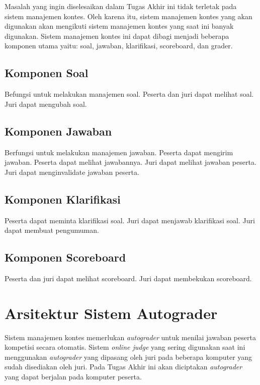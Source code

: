 \par Masalah yang ingin diselesaikan dalam Tugas Akhir ini tidak terletak pada sistem manajemen kontes. Oleh karena itu, sistem manajemen kontes yang akan digunakan akan mengikuti sistem manajemen kontes yang saat ini banyak digunakan. Sistem manajemen kontes ini dapat dibagi menjadi beberapa komponen utama yaitu: soal, jawaban, klarifikasi, scoreboard, dan grader.

\subsection{Komponen Soal}

\par Befungsi untuk melakukan manajemen soal. Peserta dan juri dapat melihat soal. Juri dapat mengubah soal.

\subsection{Komponen Jawaban}

\par Berfungsi untuk melakukan manajemen jawaban. Peserta dapat mengirim jawaban. Peserta dapat melihat jawabannya. Juri dapat melihat jawaban peserta. Juri dapat menginvalidate jawaban peserta.

\subsection{Komponen Klarifikasi}

\par Peserta dapat meminta klarifikasi soal. Juri dapat menjawab klarifikasi soal. Juri dapat membuat pengumuman.

\subsection{Komponen Scoreboard}

\par Peserta dan juri dapat melihat scoreboard. Juri dapat membekukan scoreboard.

\section{Arsitektur Sistem Autograder}

\par Sistem manajemen kontes memerlukan \textit{autograder} untuk menilai jawaban peserta kompetisi secara otomatis. Sistem \textit{online judge} yang sering digunakan saat ini menggunakan \textit{autograder} yang dipasang oleh juri pada beberapa komputer yang sudah disediakan oleh juri. Pada Tugas Akhir ini akan diciptakan \textit{autograder} yang dapat berjalan pada komputer peserta.

